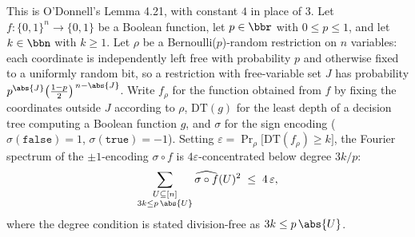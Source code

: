 \begin{theorem}
\label{RestrictionFourier.odonnell_lemma_4_21}
\leanok
{}
This is O'Donnell's Lemma 4.21, with constant $4$ in place of $3$. Let $f : \{0,1\}^n
\to \{0,1\}$ be a Boolean function, let $p \in \bbr$ with $0 \le p \le 1$, and let $k
\in \bbn$ with $k \ge 1$. Let $\rho$ be a Bernoulli($p$)-random restriction on $n$
variables: each coordinate is independently left free with probability $p$ and
otherwise fixed to a uniformly random bit, so a restriction with free-variable set $J$
has probability $p^{\abs{J}}\bigl(\tfrac{1-p}{2}\bigr)^{\,n-\abs{J}}$. Write $f_\rho$
for the function obtained from $f$ by fixing the coordinates outside $J$ according to
$\rho$, $\mathrm{DT}(g)$ for the least depth of a decision tree computing a Boolean
function $g$, and $\sigma$ for the sign encoding ($\sigma(\mathtt{false}) = 1$,
$\sigma(\mathtt{true}) = -1$). Setting
$\varepsilon = \Pr_\rho\bigl[\mathrm{DT}(f_\rho) \ge k\bigr]$, the Fourier spectrum of
the $\pm1$-encoding $\sigma \circ f$ is $4\varepsilon$-concentrated below degree
$3k/p$:
\[
  \sum_{\substack{U \subseteq [n] \\ 3k \le p\,\abs{U}}}
    \widehat{\sigma \circ f}(U)^2 \;\le\; 4\,\varepsilon,
\]
where the degree condition is stated division-free as $3k \le p\,\abs{U}$.
\end{theorem}
